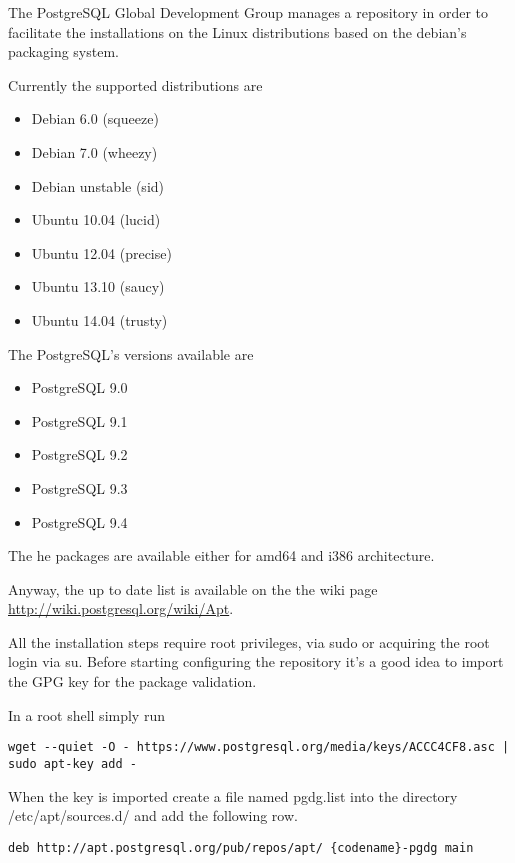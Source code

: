 The PostgreSQL Global Development Group manages a repository in order to facilitate the
installations on the Linux distributions based on the debian's packaging system. 

Currently the supported distributions are

\begin{itemize}
 \item Debian 6.0 (squeeze)
 \item Debian 7.0 (wheezy)
 \item Debian unstable (sid) 
 \item Ubuntu 10.04 (lucid)
 \item Ubuntu 12.04 (precise)
 \item Ubuntu 13.10 (saucy)
 \item Ubuntu 14.04 (trusty) 
\end{itemize}

The PostgreSQL's versions available are 
\begin{itemize}
 \item PostgreSQL 9.0 
 \item PostgreSQL 9.1 
 \item PostgreSQL 9.2 
 \item PostgreSQL 9.3
 \item PostgreSQL 9.4
\end{itemize}

The he packages are available either for amd64 and i386 architecture.

Anyway, the up to date list is available on the the wiki page 
\href{http://wiki.postgresql.org/wiki/Apt}{http://wiki.postgresql.org/wiki/Apt}.\newline

All the installation steps require root privileges, via sudo or acquiring the root login via su.
Before starting configuring the repository it's a good idea to import the GPG key for the
package validation.

In a root shell simply run
\begin{verbatim}
wget --quiet -O - https://www.postgresql.org/media/keys/ACCC4CF8.asc | sudo apt-key add -
\end{verbatim}
When the key is imported create a file named pgdg.list into the directory /etc/apt/sources.d/ and
add the following row.

\begin{verbatim}
deb http://apt.postgresql.org/pub/repos/apt/ {codename}-pgdg main
\end{verbatim}


